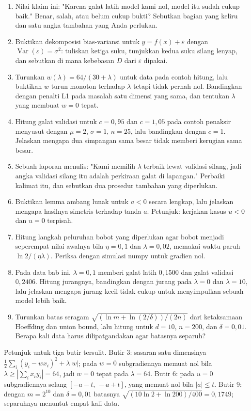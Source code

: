 \begin{latihan}
\begin{enumerate}
  \item Nilai klaim ini: "Karena galat latih model kami nol, model itu sudah cukup baik."
        Benar, salah, atau belum cukup bukti? Sebutkan bagian yang keliru dan satu angka
        tambahan yang Anda perlukan.
  \item Buktikan dekomposisi bias-variansi untuk $y=f(x)+\varepsilon$ dengan
        $\operatorname{Var}(\varepsilon)=\sigma^2$: tuliskan ketiga suku, tunjukkan kedua
        suku silang lenyap, dan sebutkan di mana kebebasan $D$ dari $\varepsilon$
        dipakai.
  \item Turunkan $w(\lambda)=64/(30+\lambda)$ untuk data pada contoh hitung, lalu
        buktikan $w$ turun monoton terhadap $\lambda$ tetapi tidak pernah nol. Bandingkan
        dengan penalti L1 pada masalah satu dimensi yang sama, dan tentukan $\lambda$
        yang membuat $w=0$ tepat.
  \item Hitung galat validasi untuk $c=0{,}95$ dan $c=1{,}05$ pada contoh penaksir
        menyusut dengan $\mu=2$, $\sigma=1$, $n=25$, lalu bandingkan dengan $c=1$.
        Jelaskan mengapa dua simpangan sama besar tidak memberi kerugian sama besar.
  \item Sebuah laporan menulis: "Kami memilih $\lambda$ terbaik lewat validasi silang,
        jadi angka validasi silang itu adalah perkiraan galat di lapangan." Perbaiki
        kalimat itu, dan sebutkan dua prosedur tambahan yang diperlukan.
  \item Buktikan lemma ambang lunak untuk $a<0$ secara lengkap, lalu jelaskan mengapa
        hasilnya simetris terhadap tanda $a$. Petunjuk: kerjakan kasus $u<0$ dan $u=0$
        terpisah.
  \item Hitung langkah peluruhan bobot yang diperlukan agar bobot menjadi seperempat
        nilai awalnya bila $\eta=0{,}1$ dan $\lambda=0{,}02$, memakai waktu paruh
        $\ln2/(\eta\lambda)$. Periksa dengan simulasi numpy untuk gradien nol.
  \item Pada data bab ini, $\lambda=0{,}1$ memberi galat latih $0{,}1500$ dan galat
        validasi $0{,}2406$. Hitung jurangnya, bandingkan dengan jurang pada $\lambda=0$
        dan $\lambda=10$, lalu jelaskan mengapa jurang kecil tidak cukup untuk
        menyimpulkan sebuah model lebih baik.
  \item Turunkan batas seragam $\sqrt{(\ln m+\ln(2/\delta))/(2n)}$ dari ketaksamaan
        Hoeffding dan union bound, lalu hitung untuk $d=10$, $n=200$, dan
        $\delta=0{,}01$. Berapa kali data harus dilipatgandakan agar batasnya separuh?
\end{enumerate}

Petunjuk untuk tiga butir tersulit. Butir 3: sasaran satu dimensinya
$\frac12\sum_i(y_i-wx_i)^2+\lambda|w|$; pada $w=0$ subgradiennya memuat nol bila
$\lambda\ge|\sum_ix_iy_i|=64$, jadi $w=0$ tepat pada $\lambda=64$. Butir 6: pada $u=0$
subgradiennya selang $[-a-t,\,-a+t]$, yang memuat nol bila $|a|\le t$. Butir 9: dengan
$m=2^{10}$ dan $\delta=0{,}01$ batasnya $\sqrt{(10\ln2+\ln200)/400}=0{,}1749$;
separuhnya menuntut empat kali data.
\end{latihan}

